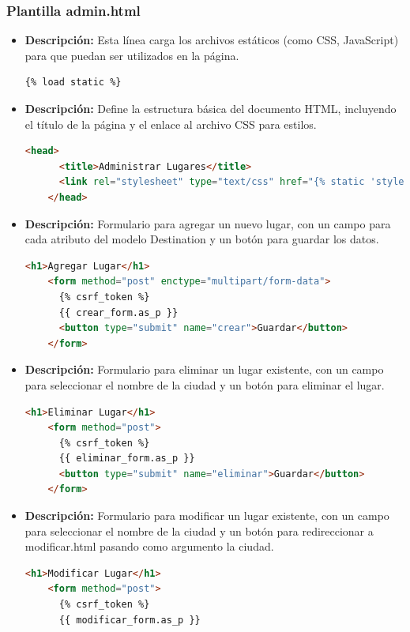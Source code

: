 \documentclass{article}
\begin{document}
  \subsubsection{Plantilla admin.html}
  \begin{itemize}
    \item \textbf{Descripción: }Esta línea carga los archivos estáticos (como CSS, JavaScript) para que puedan ser utilizados en la página.
    \begin{lstlisting}[language=html]
    {% load static %}
    \end{lstlisting}
    \item \textbf{Descripción: }Define la estructura básica del documento HTML, incluyendo el título de la página y el enlace al archivo 
    CSS para estilos.
    \begin{lstlisting}[language=html]
    <head>
      <title>Administrar Lugares</title>
      <link rel="stylesheet" type="text/css" href="{% static 'styles/styles.css' %}">
    </head>
    \end{lstlisting}
    \item \textbf{Descripción: }Formulario para agregar un nuevo lugar, con un campo para cada atributo del modelo Destination y un 
    botón para guardar los datos. 
    \begin{lstlisting}[language=html]
    <h1>Agregar Lugar</h1>
    <form method="post" enctype="multipart/form-data">
      {% csrf_token %}
      {{ crear_form.as_p }}
      <button type="submit" name="crear">Guardar</button>
    </form>
    \end{lstlisting}
    \newpage
    \item \textbf{Descripción: }Formulario para eliminar un lugar existente, con un campo para seleccionar el nombre de la ciudad y un 
    botón para eliminar el lugar.
    \begin{lstlisting}[language=html]
    <h1>Eliminar Lugar</h1>
    <form method="post">
      {% csrf_token %}
      {{ eliminar_form.as_p }}
      <button type="submit" name="eliminar">Guardar</button>
    </form>
    \end{lstlisting}
    \item \textbf{Descripción: }Formulario para modificar un lugar existente, con un campo para seleccionar el nombre de la ciudad y 
    un botón para redireccionar a modificar.html pasando como argumento la ciudad.
    \begin{lstlisting}[language=html]
    <h1>Modificar Lugar</h1>
    <form method="post">
      {% csrf_token %}
      {{ modificar_form.as_p }}

\end{lstlisting}
\end{itemize}
\end{document}
